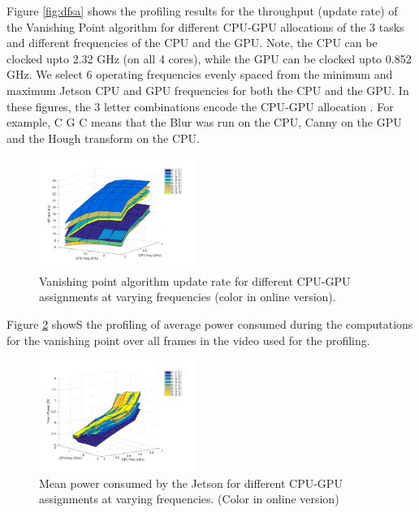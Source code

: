 

Figure \ref{fig:dfsa} shows the profiling results for the throughput (update rate) of the Vanishing Point algorithm for different CPU-GPU allocations of the 3 tasks and different frequencies of the CPU and the GPU. 
Note, the CPU can be clocked upto 2.32 GHz (on all 4 cores), while the GPU can be clocked upto 0.852 GHz. 
We select 6 operating frequencies evenly spaced from the minimum and maximum Jetson CPU and GPU frequencies for both the CPU and the GPU. 
In these figures, the 3 letter combinations encode the CPU-GPU allocation .
For example, C G C means that the Blur was run on the CPU, Canny on the GPU and the Hough transform on the CPU.


\begin{figure}[htbp]
	\centering
	\includegraphics[width=0.46\textwidth]{Figs/surf_Rate.pdf}
	\caption{Vanishing point algorithm update rate for different CPU-GPU assignments at varying frequencies (color in online version).}
	\label{fig:sfda}%
\end{figure}


Figure \ref{fig:sfda_pow} showS the profiling of average power consumed during the computations for the vanishing point over all frames in the video used for the profiling.


\begin{figure}[htbp]
	\centering
	\includegraphics[width=0.46\textwidth]{Figs/surf_Power.pdf}
	\caption{Mean power consumed by the Jetson for different CPU-GPU assignments at varying frequencies. (Color in online version)}
	\label{fig:sfda_pow}%
\end{figure}

